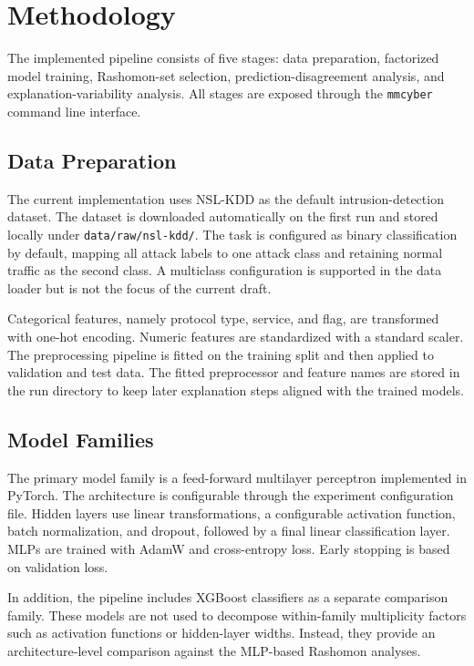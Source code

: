\section{Methodology}

The implemented pipeline consists of five stages: data preparation, factorized model training, Rashomon-set selection, prediction-disagreement analysis, and explanation-variability analysis. All stages are exposed through the \texttt{mmcyber} command line interface.

\subsection{Data Preparation}

The current implementation uses NSL-KDD as the default intrusion-detection dataset. The dataset is downloaded automatically on the first run and stored locally under \texttt{data/raw/nsl-kdd/}. The task is configured as binary classification by default, mapping all attack labels to one attack class and retaining normal traffic as the second class. A multiclass configuration is supported in the data loader but is not the focus of the current draft.

Categorical features, namely protocol type, service, and flag, are transformed with one-hot encoding. Numeric features are standardized with a standard scaler. The preprocessing pipeline is fitted on the training split and then applied to validation and test data. The fitted preprocessor and feature names are stored in the run directory to keep later explanation steps aligned with the trained models.

\subsection{Model Families}

The primary model family is a feed-forward multilayer perceptron implemented in PyTorch. The architecture is configurable through the experiment configuration file. Hidden layers use linear transformations, a configurable activation function, batch normalization, and dropout, followed by a final linear classification layer. MLPs are trained with AdamW and cross-entropy loss. Early stopping is based on validation loss.

In addition, the pipeline includes XGBoost classifiers as a separate comparison family. These models are not used to decompose within-family multiplicity factors such as activation functions or hidden-layer widths. Instead, they provide an architecture-level comparison against the MLP-based Rashomon analyses.

